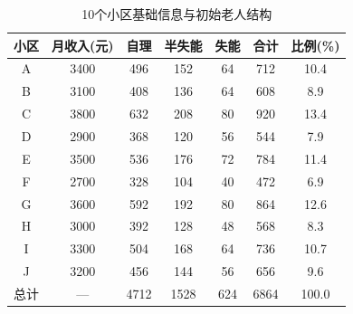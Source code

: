 \begin{table}[h]
\centering
\caption{10个小区基础信息与初始老人结构}
\begin{tabular}{|c|c|c|c|c|c|c|}
\hline
小区 & 月收入(元) & 自理 & 半失能 & 失能 & 合计 & 比例(\%) \\
\hline
A & 3400 & 496 & 152 & 64 & 712 & 10.4 \\
B & 3100 & 408 & 136 & 64 & 608 & 8.9 \\
C & 3800 & 632 & 208 & 80 & 920 & 13.4 \\
D & 2900 & 368 & 120 & 56 & 544 & 7.9 \\
E & 3500 & 536 & 176 & 72 & 784 & 11.4 \\
F & 2700 & 328 & 104 & 40 & 472 & 6.9 \\
G & 3600 & 592 & 192 & 80 & 864 & 12.6 \\
H & 3000 & 392 & 128 & 48 & 568 & 8.3 \\
I & 3300 & 504 & 168 & 64 & 736 & 10.7 \\
J & 3200 & 456 & 144 & 56 & 656 & 9.6 \\
\hline
总计 & — & 4712 & 1528 & 624 & 6864 & 100.0 \\
\hline
\end{tabular}
\end{table}
